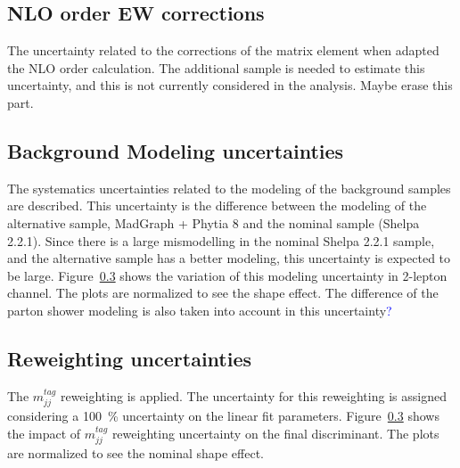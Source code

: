 \color{blue}
{
\subsection{NLO order EW corrections}
The uncertainty related to the corrections of the matrix element when adapted the NLO order calculation. The additional sample is needed to estimate this uncertainty, and this is not currently considered in the analysis. Maybe erase this part.
}
\color{black}
\subsection{Background Modeling uncertainties}
The systematics uncertainties related to the modeling of the background samples are described. This uncertainty is the difference between the modeling of the alternative sample, MadGraph + Phytia 8 and the nominal sample (Shelpa 2.2.1). Since there is a large mismodelling in the nominal Shelpa 2.2.1 sample, and the alternative sample has a better modeling, this uncertainty is expected to be large.
Figure~\ref{} shows the variation of this modeling uncertainty in 2-lepton channel. The plots are normalized to see the shape effect.
The difference of the parton shower modeling is also taken into account in this uncertainty\textcolor{blue}{?}
\subsection{Reweighting uncertainties}
The $m^{tag}_{jj}$ reweighting is applied. The uncertainty for this reweighting is assigned considering a 100~\% uncertainty on the linear fit parameters. 
Figure~\ref{} shows the impact of $m^{tag}_{jj}$ reweighting uncertainty on the final discriminant. The plots are normalized to see the nominal shape effect.

